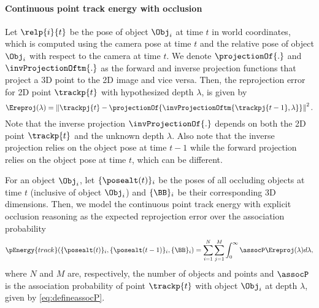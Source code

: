 \vspace{-0.3cm}
\paragraph{Continuous point track energy with occlusion}
Let $\relp{i}{t}$ be the pose of object $\Obj_i$ at time $t$ in world coordinates, which is computed using the camera pose at time $t$ and the relative pose of object $\Obj_i$ with respect to the camera at time $t$. We denote $\projectionOf{.}$ and $\invProjectionOftm{.}$ as the forward and inverse projection functions that project a 3D point to the 2D image and vice versa. Then, the reprojection error for 2D point $\trackp{t}$ with hypothesized depth $\lambda$, is given by
\begin{equation}
\Ereproj(\lambda) = \left\|\trackpj{t} - \projectionOf{\invProjectionOftm{\trackpj{t-1}, \lambda}}\right\|^2.
\label{eq:reprojerror}
\end{equation}
Note that the inverse projection $\invProjectionOf{.}$ depends on both the 2D point $\trackp{t}$ and the unknown depth $\lambda$. Also note that the inverse projection relies on the object pose at time $t-1$ while the forward projection relies on the object pose at time $t$, which can be different.

For an object $\Obj_i$, let $\{ \posealt (t) \}_i$ be the poses of all occluding objects at time $t$ (inclusive of object $\Obj_i$) and $ \{ \BB \}_i$ be their corresponding 3D dimensions. Then, we model the continuous point track energy with explicit occlusion reasoning as the expected reprojection error over the association probability
\begin{align}
  \pEnergy{track}(\{ \posealt (t) \}_i, \{ \posealt (t-1) \}_i, \{ \BB \}_i )
    = \sum_{i=1}^{N} 
    \sum_{j = 1}^{M}
    \int_0^\infty \assocP\Ereproj(\lambda) d\lambda,
\end{align}
where $N$ and $M$ are, respectively, the number of objects and points and $\assocP$ is the association probability of point $\trackp{t}$ with object $\Obj_i$ at depth $\lambda$, given by \eqref{eq:defineassocP}.


